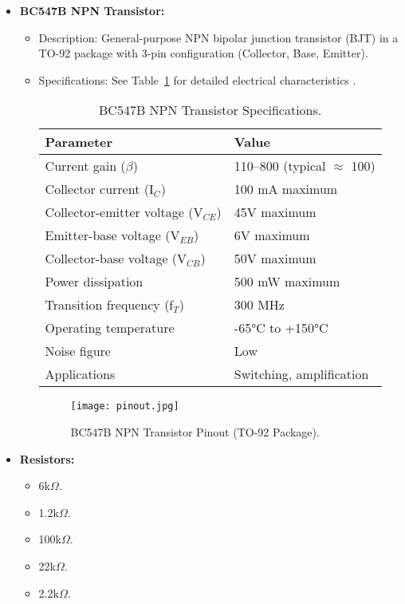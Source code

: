 \documentclass[conference]{IEEEtran}
\begin{document}
\begin{itemize}
    \item \textbf{BC547B NPN Transistor:} 
    \begin{itemize}
        \item Description: General-purpose NPN bipolar junction transistor (BJT) in a TO-92 package with 3-pin configuration (Collector, Base, Emitter).
        \item Specifications: See Table~\ref{tab:bc547_specs} for detailed electrical characteristics \cite{BC547_Datasheet}.
        \begin{table}[h]
            \centering
            \begin{tabular}{ll}
                \toprule
                \textbf{Parameter} & \textbf{Value} \\
                \midrule
                Current gain ($\beta$) & 110–800 (typical $\approx$ 100) \\
                Collector current (I$_C$) & 100 mA maximum \\
                Collector-emitter voltage (V$_{CE}$) & 45V maximum \\
                Emitter-base voltage (V$_{EB}$) & 6V maximum \\
                Collector-base voltage (V$_{CB}$) & 50V maximum \\
                Power dissipation & 500 mW maximum \\
                Transition frequency (f$_T$) & 300 MHz \\
                Operating temperature & -65°C to +150°C \\
                Noise figure & Low \\
                Applications & Switching, amplification \\
                \bottomrule
            \end{tabular}
            \caption{BC547B NPN Transistor Specifications.}
            \label{tab:bc547_specs}
        \end{table}
        \begin{figure}[h]
            \centering
            \texttt{[image: pinout.jpg]} %
            \caption{BC547B NPN Transistor Pinout (TO-92 Package).}
            \label{fig:bc547_pinout}
        \end{figure}
    \end{itemize}

    \item \textbf{Resistors:} 
    \begin{itemize}
        \item 6k$\Omega$.
        \item 1.2k$\Omega$.
        \item 100k$\Omega$.
        \item 22k$\Omega$.
        \item 2.2k$\Omega$.
    \end{itemize}


\end{itemize}
\end{document}
